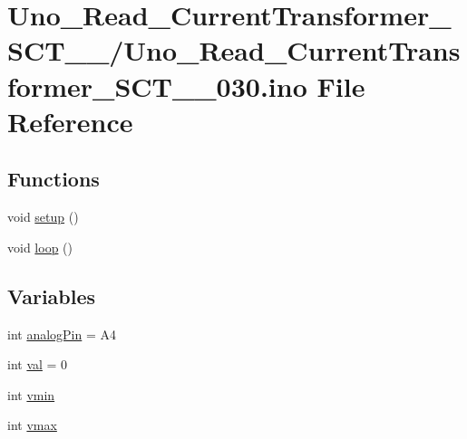 \hypertarget{Uno__Read__CurrentTransformer__SCT__013__030_8ino}{\section{Uno\-\_\-\-Read\-\_\-\-Current\-Transformer\-\_\-\-S\-C\-T\-\_\-\_/\-Uno\-\_\-\-Read\-\_\-\-Current\-Transformer\-\_\-\-S\-C\-T\-\_\-\_\-030.ino File Reference}
\label{Uno__Read__CurrentTransformer__SCT__013__030_8ino}
}
\subsection*{Functions}
\begin{DoxyCompactItemize}
\item 
void \hyperlink{Uno__Read__CurrentTransformer__SCT__013__030_8ino_a4fc01d736fe50cf5b977f755b675f11d}{setup} ()
\item 
void \hyperlink{Uno__Read__CurrentTransformer__SCT__013__030_8ino_afe461d27b9c48d5921c00d521181f12f}{loop} ()
\end{DoxyCompactItemize}
\subsection*{Variables}
\begin{DoxyCompactItemize}
\item 
int \hyperlink{Uno__Read__CurrentTransformer__SCT__013__030_8ino_ac980a12cabd1d7c5bde8f3b443d0c164}{analog\-Pin} = A4
\item 
int \hyperlink{Uno__Read__CurrentTransformer__SCT__013__030_8ino_aa0ccb5ee6d882ee3605ff47745c6467b}{val} = 0
\item 
int \hyperlink{Uno__Read__CurrentTransformer__SCT__013__030_8ino_af0d5eb5af7b3da35f3ad085dff317238}{vmin}
\item 
int \hyperlink{Uno__Read__CurrentTransformer__SCT__013__030_8ino_aeb4eb9ad2dc148d828a7f6e270aa0f09}{vmax}
\end{DoxyCompactItemize}


